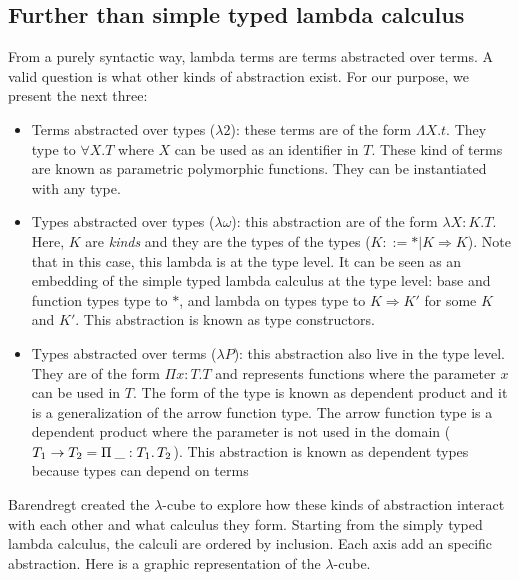 \subsection{Further than simple typed lambda calculus}
\newcommand{\lambdaCube}{$\lambda$-cube}
From a purely syntactic way, lambda terms are terms abstracted over terms. A valid question is what other kinds
of abstraction exist. For our purpose, we present the next three:
\begin{itemize}
    \item Terms abstracted over types ($\lambda 2$): these terms are of the form $\Lambda X.t$. They type to
    $\forall X.T$ where $X$ can be used as an identifier in $T$. These kind of terms are known as parametric
    polymorphic functions. They can be instantiated with any type.
    
    \item Types abstracted over types ($\lambda \omega$): this abstraction are of the form $\lambda X:K.T$.
    Here, $K$ are \emph{kinds} and they are the types of the types ($K::=\ast|K\Rightarrow K$).
    Note that in this case, this lambda is at the type level. It can be seen as an embedding of the 
    simple typed lambda calculus at the type level: base and function types type to $\ast$, and lambda on 
    types type to $K\Rightarrow K'$ for some $K$ and $K'$. This abstraction is known as type constructors. 
    
    \item Types abstracted over terms ($\lambda P$): this abstraction also live in the type level. They 
    are of the form $\Pi x:T.T$ and represents functions where the parameter $x$ can be used in $T$. 
    The form of the type is known as dependent product and it is a generalization of the arrow function type.
    The arrow function type is a dependent product where the parameter is not used in the domain
    ($\arrow{T_1}{T_2} = \depArrow{\:\_}{T_1}{T_2}$). This abstraction is known as dependent types because
    types can depend on terms
\end{itemize}

Barendregt created the \lambdaCube{} \cite{barendregt1991:PTS}
to explore how these kinds of abstraction interact with each other and
what calculus they form. Starting from the simply typed lambda calculus, the calculi are ordered by inclusion. Each
axis add an specific abstraction. Here is a graphic representation of the \lambdaCube{}.

\begin{center}
\end{center}

